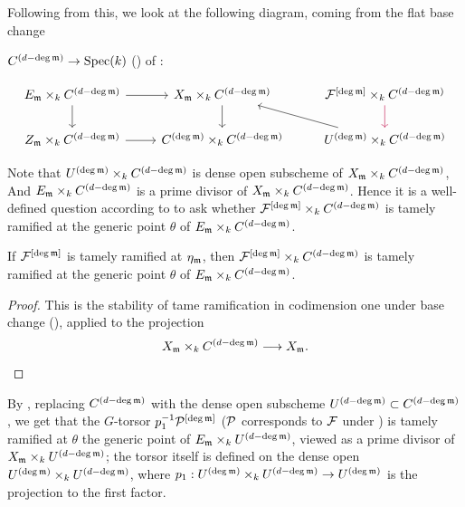 Following from this, we look at the following diagram, coming from the flat base change

$C^{(d - \deg \mathfrak{m})} \to \operatorname{Spec}(k)$ () of :

\[\begin{tikzcd}
E_{\mdls} \times_k C^{(d-\deg \mdls)} \arrow[r] \arrow[d] & X_{\mdls} \times_k C^{(d-\deg \mdls)} \arrow[d] & \cF^{[\deg \mdls]} \times_k C^{(d-\deg \mdls)} \arrow[d, color=purple] \\
Z_\mdls \times_k C^{(d-\deg \mdls)} \arrow[r] & C^{(\deg \mdls)} \times_k C^{(d-\deg \mdls)} & U^{(\deg \mdls)} \times_k C^{(d-\deg \mdls)} \arrow[lu]
\end{tikzcd}\]

Note that $U^{(\deg \mathfrak{m})} \times_k C^{(d-\deg \mathfrak{m})}$ is dense open subscheme of $X_{\mathfrak{m}} \times_k C^{(d-\deg \mathfrak{m})}$,
And $E_{\mathfrak{m}} \times_k C^{(d-\deg \mathfrak{m})}$ is a prime divisor of $X_{\mathfrak{m}} \times_k C^{(d-\deg \mathfrak{m})}$.
Hence it is a well-defined question according to  to ask whether
$\mathcal{F}^{[\deg \mathfrak{m}]} \times_k C^{(d-\deg \mathfrak{m})}$ is tamely ramified at the generic point $\theta$ of
$E_{\mathfrak{m}} \times_k C^{(d-\deg \mathfrak{m})}$.

\begin{lemma}\label{lemma:tame_ramification_persists}
     If $\mathcal{F}^{[\deg \mathfrak{m}]}$ is tamely ramified at $\eta_{\mathfrak{m}}$, then
     $\mathcal{F}^{[\deg \mathfrak{m}]} \times_k C^{(d-\deg \mathfrak{m})}$ is tamely ramified at the generic point $\theta$ of
     $E_{\mathfrak{m}} \times_k C^{(d-\deg \mathfrak{m})}$.
\end{lemma}
\begin{proof}
This is the stability of tame ramification in codimension one under base
change (), applied to the projection
\[
X_{\mathfrak{m}}\times_k C^{(d-\deg\mathfrak{m})}\longrightarrow X_{\mathfrak{m}}.
\]
\end{proof}


By , replacing $C^{(d - \deg \mathfrak{m})}$ with the dense open subscheme $U^{(d - \deg \mathfrak{m})} \subset C^{(d - \deg \mathfrak{m})}$,
we get that the $G$-torsor $p_1^{-1} \mathcal{P}^{[\deg \mathfrak{m}]}$ ($\mathcal{P}$ corresponds to $\mathcal{F}$ under )
is tamely ramified at $\theta$ the generic point of
$E_{\mathfrak{m}} \times_k U^{(d-\deg \mathfrak{m})}$, viewed as a prime divisor of
$X_{\mathfrak{m}}\times_k U^{(d-\deg\mathfrak{m})}$; the torsor itself is defined on the
dense open $U^{(\deg\mathfrak{m})}\times_k U^{(d-\deg\mathfrak{m})}$,
where $p_1: U^{(\deg \mathfrak{m})} \times_k U^{(d - \deg \mathfrak{m})} \to U^{(\deg \mathfrak{m})}$ is the projection to the first factor.


